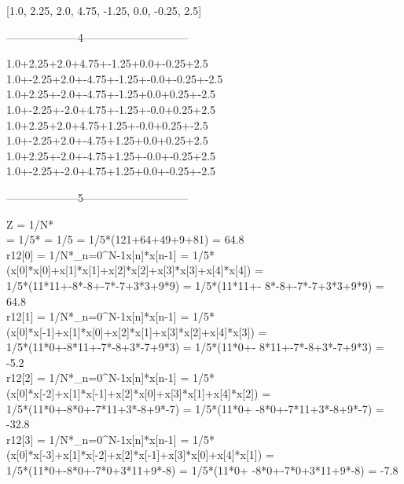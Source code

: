 \documentclass[landscape, 12pt]{report}
\begin{document}
[1.0, 2.25, 2.0, 4.75, -1.25, 0.0, -0.25, 2.5]\\

\begin{center}
--------------------4-----------------------------
\end{center}
1.0+2.25+2.0+4.75+-1.25+0.0+-0.25+2.5\\
1.0+-2.25+2.0+-4.75+-1.25+-0.0+-0.25+-2.5\\
1.0+2.25+-2.0+-4.75+-1.25+0.0+0.25+-2.5\\
1.0+-2.25+-2.0+4.75+-1.25+-0.0+0.25+2.5\\
1.0+2.25+2.0+4.75+1.25+-0.0+0.25+-2.5\\
1.0+-2.25+2.0+-4.75+1.25+0.0+0.25+2.5\\
1.0+2.25+-2.0+-4.75+1.25+-0.0+-0.25+2.5\\
1.0+-2.25+-2.0+4.75+1.25+0.0+-0.25+-2.5\\



\begin{center}
--------------------5-----------------------------
\end{center}
Z = 1/N* \\= 1/5* = 1/5 = 1/5*(121+64+49+9+81) = 64.8\\
r12[0] = 1/N*\sum_{n=0}^{N-1}{x[n]*x[n-1]} = 1/5*(x[0]*x[0]+x[1]*x[1]+x[2]*x[2]+x[3]*x[3]+x[4]*x[4]) = \\1/5*(11*11+-8*-8+-7*-7+3*3+9*9) = 1/5*(11*11+-
8*-8+-7*-7+3*3+9*9) = 64.8\\

r12[1] = 1/N*\sum_{n=0}^{N-1}{x[n]*x[n-1]} = 1/5*(x[0]*x[-1]+x[1]*x[0]+x[2]*x[1]+x[3]*x[2]+x[4]*x[3]) = \\1/5*(11*0+-8*11+-7*-8+3*-7+9*3) = 1/5*(11*0+-
8*11+-7*-8+3*-7+9*3) = -5.2\\

r12[2] = 1/N*\sum_{n=0}^{N-1}{x[n]*x[n-1]} = 1/5*(x[0]*x[-2]+x[1]*x[-1]+x[2]*x[0]+x[3]*x[1]+x[4]*x[2]) = \\1/5*(11*0+-8*0+-7*11+3*-8+9*-7) = 1/5*(11*0+
-8*0+-7*11+3*-8+9*-7) = -32.8\\

r12[3] = 1/N*\sum_{n=0}^{N-1}{x[n]*x[n-1]} = 1/5*(x[0]*x[-3]+x[1]*x[-2]+x[2]*x[-1]+x[3]*x[0]+x[4]*x[1]) = \\1/5*(11*0+-8*0+-7*0+3*11+9*-8) = 1/5*(11*0+
-8*0+-7*0+3*11+9*-8) = -7.8\\
\end{document}
